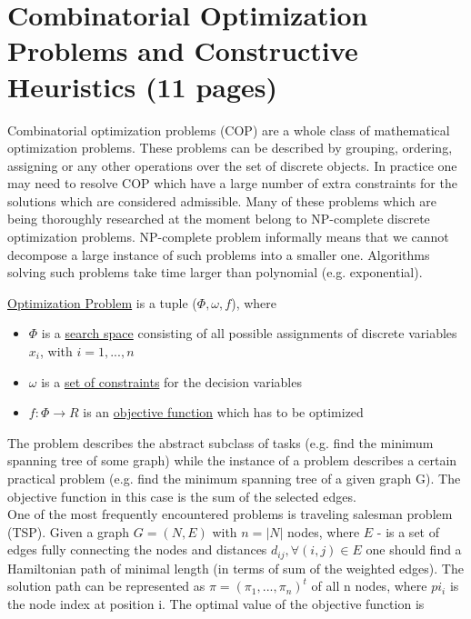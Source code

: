 \section{Combinatorial Optimization Problems and Constructive
Heuristics (11 pages)}

Combinatorial optimization problems (COP) are a whole class of mathematical optimization problems. These problems can be described by grouping, ordering, assigning or any other operations over the set of discrete objects. In practice one may need to resolve COP which have a large number of extra constraints for the solutions which are considered admissible. Many of these problems which are being thoroughly researched at the moment belong to NP-complete discrete optimization problems. NP-complete problem informally means that we cannot decompose a large instance of such problems into a smaller one. Algorithms solving such problems take time larger than polynomial (e.g. exponential).

\begin{definition}
	\underline{Optimization Problem} is a tuple ($\Phi,\omega, f$), where
	\begin{itemize}
		\item{$\Phi$ is a \underline{search space} consisting of all possible assignments of discrete variables $x_i$, with $i=1,...,n$ }
		\item{$\omega$ is a \underline{set of constraints} for the decision variables}
		\item{$f:\Phi \to R$ is an \underline{objective function} which has to be optimized}
	\end{itemize}
\end{definition}

The problem describes the abstract subclass of tasks (e.g. find the minimum spanning tree of some graph) while the instance of a problem describes a certain practical problem (e.g. find the minimum spanning tree of a given graph G). The objective function in this case is the sum of the selected edges. \\
One of the most frequently encountered problems is traveling salesman problem (TSP). Given a graph $G=(N,E)$ with $n=|N|$ nodes, where $E$ - is a set of edges fully connecting the nodes and distances $d_{ij}, \forall(i,j) \in E$ one should find a Hamiltonian path of minimal length (in terms of sum of the weighted edges). The solution path can be represented as $\pi=(\pi_1,...,\pi_n)^t$ of all n nodes, where $pi_i$ is the node index at position i. The optimal value of the objective function is

